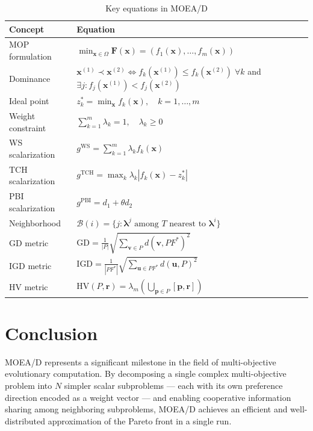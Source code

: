 \documentclass[12pt,a4paper]{article}
\begin{document}
\begin{table}[H]
\centering
\caption{Key equations in MOEA/D}
\label{tab:math_summary}
\renewcommand{\arraystretch}{1.6}
\begin{tabular}{p{4cm} p{10cm}}
\toprule
\textbf{Concept} & \textbf{Equation} \\
\midrule
MOP formulation & $\min_{\mathbf{x} \in \Omega} \mathbf{F}(\mathbf{x}) = (f_1(\mathbf{x}), \ldots, f_m(\mathbf{x}))$ \\
Dominance & $\mathbf{x}^{(1)} \prec \mathbf{x}^{(2)} \Leftrightarrow f_k(\mathbf{x}^{(1)}) \leq f_k(\mathbf{x}^{(2)})\;\forall k$ and $\exists j: f_j(\mathbf{x}^{(1)}) < f_j(\mathbf{x}^{(2)})$ \\
Ideal point & $z_k^* = \min_{\mathbf{x}} f_k(\mathbf{x}), \quad k = 1, \ldots, m$ \\
Weight constraint & $\sum_{k=1}^m \lambda_k = 1, \quad \lambda_k \geq 0$ \\
WS scalarization & $g^{\text{WS}} = \sum_{k=1}^m \lambda_k f_k(\mathbf{x})$ \\
TCH scalarization & $g^{\text{TCH}} = \max_{k} \lambda_k |f_k(\mathbf{x}) - z_k^*|$ \\
PBI scalarization & $g^{\text{PBI}} = d_1 + \theta d_2$ \\
Neighborhood & $\mathcal{B}(i) = \{j : \boldsymbol{\lambda}^j \text{ among } T \text{ nearest to } \boldsymbol{\lambda}^i\}$ \\
GD metric & $\text{GD} = \frac{1}{|P|}\sqrt{\sum_{\mathbf{v}\in P} d(\mathbf{v}, PF^*)^2}$ \\
IGD metric & $\text{IGD} = \frac{1}{|PF^*|}\sqrt{\sum_{\mathbf{u}\in PF^*} d(\mathbf{u}, P)^2}$ \\
HV metric & $\text{HV}(P,\mathbf{r}) = \lambda_m\!\left(\bigcup_{\mathbf{p}\in P}[\mathbf{p},\mathbf{r}]\right)$ \\
\bottomrule
\end{tabular}
\end{table}

\section{Conclusion}
\label{sec:conclusion}

MOEA/D represents a significant milestone in the field of multi-objective evolutionary computation. By decomposing a single complex multi-objective problem into $N$ simpler scalar subproblems --- each with its own preference direction encoded as a weight vector --- and enabling cooperative information sharing among neighboring subproblems, MOEA/D achieves an efficient and well-distributed approximation of the Pareto front in a single run.
\end{document}

